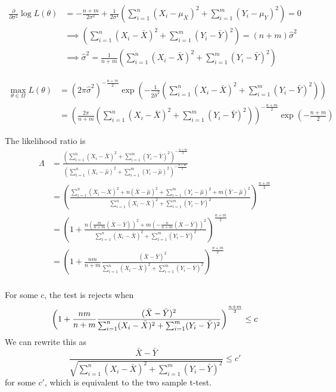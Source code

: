 \documentclass{article}
\newcommand{\sumN}{\sum_{i=1}^{n}}
\newcommand{\sumM}{\sum_{i=1}^{m}}
\begin{document}
\begin{align*}
	\frac{\partial}{\partial \sigma^2 } \log L(\theta) &=
	-\frac{n+m}{2\sigma^2} +\frac{1}{2\sigma^4}\left(\sumN (X_i - \mu_X)^2 + \sumM (Y_i - \mu_Y)^2\right)
	= 0 \\
	&\implies \left(\sumN (X_i - \bar{X})^2 + \sumM (Y_i - \bar{Y})^2\right) = (n+m)\hat{\sigma}^2 \\
	&\implies \hat{\sigma}^2 = \frac{1}{n+m}\left(\sumN (X_i - \bar{X})^2 + \sumM (Y_i - \bar{Y})^2\right)
\end{align*}

\begin{align*}
	\max_{\theta \in \Omega} L(\theta) &=
	(2\pi\hat{\sigma}^2)^{-\frac{n+m}{2}} \exp \left(-\frac{1}{2\hat{\sigma}^2}\left(\sumN (X_i - \bar{X})^2 + \sumM (Y_i - \bar{Y})^2 \right)\right) \\
	&= \left(\frac{2\pi}{n+m}\left(\sumN (X_i - \bar{X})^2 + \sumM (Y_i - \bar{Y})^2\right)\right)^{-\frac{n+m}{2}} \exp\left(-\frac{n+m}{2}\right)
\end{align*}

The likelihood ratio is 
\begin{align*}
	\Lambda &= \frac{\left(\sumN (X_i - \bar{X})^2 + \sumM (Y_i - \bar{Y})^2\right)^{-\frac{n+m}{2}}}{\left(\sumN (X_i - \hat{\mu})^2 + \sumM (Y_i - \hat{\mu})^2\right)^{-\frac{n+m}{2}}} \\
	&= \left(\frac{\sumN (X_i - \bar{X})^2 + n(\bar{X} - \hat{\mu})^2 + \sumM (Y_i - \hat{\mu})^2 + m(\bar{Y} - \hat{\mu})^2}{\sumN (X_i - \bar{X})^2 + \sumM (Y_i - \bar{Y})^2}\right)^{\frac{n+m}{2}} \\
	&= \left(1 + \frac{n\left(\frac{m}{n+m}(\bar{X}-\bar{Y})\right)^2  + m\left(-\frac{n}{n+m}(\bar{X}-\bar{Y})\right)^2                  }{\sumN (X_i - \bar{X})^2 + \sumM (Y_i - \bar{Y})^2}\right)^{\frac{n+m}{2}} \\
	&= \left(1 + \frac{nm}{n+m}\frac{(\bar{X} - \bar{Y})^2}{\sumN (X_i - \bar{X})^2 + \sumM (Y_i - \bar{Y})^2}\right)^{\frac{n+m}{2}} \\
\end{align*}

For some $c$, the test is rejects when
\[
	\left(1 + \frac{nm}{n+m}\frac{(\bar{X} - \bar{Y})^2}{\sumN (X_i - \bar{X})^2 + \sumM (Y_i - \bar{Y})^2}\right)^{\frac{n+m}{2}} \leq c\\
\]
We can rewrite this as
\[
	\frac{\bar{X}-\bar{Y}}{\sqrt{\sumN (X_i - \bar{X})^2 + \sumM (Y_i - \bar{Y})^2}} \leq c'
\]
for some $c'$, which is equivalent to the two sample t-test.
	
\end{document}
